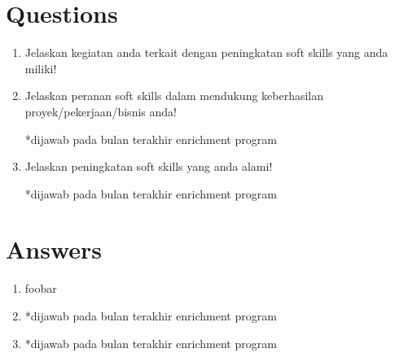 \documentclass[12pt, letterpaper]{article}
\begin{document}
\section*{Questions}
\begin{enumerate}
    \item Jelaskan kegiatan anda terkait dengan peningkatan soft skills yang anda miliki!
    \item Jelaskan peranan soft skills dalam mendukung keberhasilan proyek/pekerjaan/bisnis anda!
    
    *dijawab pada bulan terakhir enrichment program
    \item Jelaskan peningkatan soft skills yang anda alami!
    
    *dijawab pada bulan terakhir enrichment program
\end{enumerate}

\section*{Answers}
\begin{enumerate}
    \item foobar
    \item *dijawab pada bulan terakhir enrichment program
    \item *dijawab pada bulan terakhir enrichment program
\end{enumerate}
\end{document}
